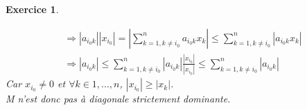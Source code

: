 \documentclass[a4paper,11pt]{article}
\newtheorem{exo}{Exercice}
\newcommand{\abs}[1]{\left\lvert#1\right\rvert}
\begin{document}
\begin{exo}
\begin{enumerate}
\begin{equation}
\begin{aligned}
& \Rightarrow \abs{a_{i_0k}}\abs{x_{i_0}} = \abs{\sum\limits_{k=1,k\neq i_0}^n a_{i_0k}x_k} \le \sum\limits_{k=1,k\neq i_0}^n \abs{a_{i_0k}x_k} \ \\
& \Rightarrow \abs{a_{i_0k}} \le \sum\limits_{k=1,k\neq i_0}^n \abs{a_{i_0k}}\frac{\abs{x_{i_0}}}{\abs{x_{i_0}}}  \le \sum\limits_{k=1,k\neq i_0}^n \abs{a_{i_0k}}
\end{aligned}
\end{equation}
Car $x_{i_0} \ne 0 $ et  $\forall k \in 1,...,n$, $\abs{x_{i_0}} \ge \abs{x_k}$. \ \\
{\it M} n'est donc pas à diagonale strictement dominante.
\end{enumerate}
\end{exo}

\end{document}
